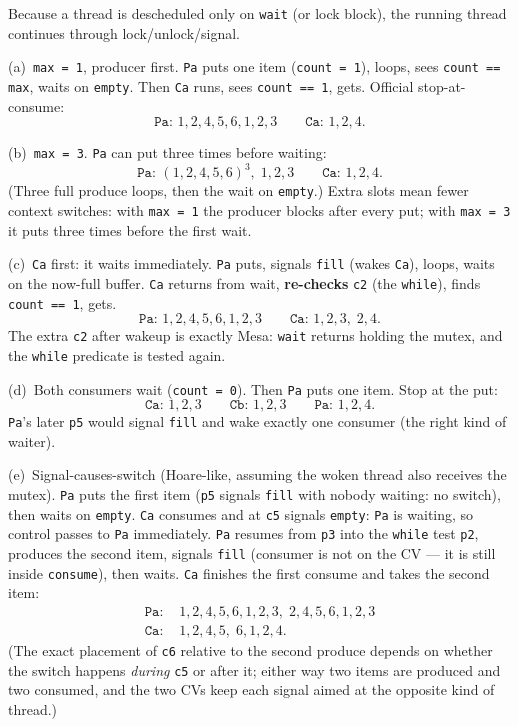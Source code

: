 \documentclass[11pt,a4paper]{article}
\newenvironment{Sol}{%
  \begin{tcolorbox}[sboxstyle, title={Solution}]%
}{%
  \end{tcolorbox}\vspace{0.35em}%
}
\begin{document}
\begin{Sol}
Because a thread is descheduled only on \texttt{wait} (or lock block),
the running thread continues through lock/unlock/signal.

(a)~\texttt{max = 1}, producer first. \texttt{Pa} puts one item
(\texttt{count = 1}), loops, sees \texttt{count == max}, waits on
\texttt{empty}. Then \texttt{Ca} runs, sees \texttt{count == 1}, gets.
Official stop-at-consume:
\[
\texttt{Pa: } 1,2,4,5,6,1,2,3
\qquad
\texttt{Ca: } 1,2,4.
\]

(b)~\texttt{max = 3}. \texttt{Pa} can put three times before waiting:
\[
\texttt{Pa: } (1,2,4,5,6)^3,\; 1,2,3
\qquad
\texttt{Ca: } 1,2,4.
\]
(Three full produce loops, then the wait on \texttt{empty}.) Extra
slots mean fewer context switches: with \texttt{max = 1} the producer
blocks after every put; with \texttt{max = 3} it puts three times
before the first wait.

(c)~\texttt{Ca} first: it waits immediately. \texttt{Pa} puts, signals
\texttt{fill} (wakes \texttt{Ca}), loops, waits on the now-full buffer.
\texttt{Ca} returns from wait, \textbf{re-checks} \texttt{c2} (the
\texttt{while}), finds \texttt{count == 1}, gets.
\[
\texttt{Pa: } 1,2,4,5,6,1,2,3
\qquad
\texttt{Ca: } 1,2,3,\;2,4.
\]
The extra \texttt{c2} after wakeup is exactly Mesa: \texttt{wait}
returns holding the mutex, and the \texttt{while} predicate is tested
again.

(d)~Both consumers wait (\texttt{count = 0}). Then \texttt{Pa} puts
one item. Stop at the put:
\[
\texttt{Ca: } 1,2,3
\qquad
\texttt{Cb: } 1,2,3
\qquad
\texttt{Pa: } 1,2,4.
\]
\texttt{Pa}'s later \texttt{p5} would signal \texttt{fill} and wake
exactly one consumer (the right kind of waiter).

(e)~Signal-causes-switch (Hoare-like, assuming the woken thread also receives the mutex). \texttt{Pa} puts the first item
(\texttt{p5} signals \texttt{fill} with nobody waiting: no switch),
then waits on \texttt{empty}. \texttt{Ca} consumes and at \texttt{c5}
signals \texttt{empty}: \texttt{Pa} is waiting, so control passes to
\texttt{Pa} immediately. \texttt{Pa} resumes from \texttt{p3} into the
\texttt{while} test \texttt{p2}, produces the second item, signals
\texttt{fill} (consumer is not on the CV --- it is still inside
\texttt{consume}), then waits. \texttt{Ca} finishes the first consume
and takes the second item:
\[
\begin{aligned}
\texttt{Pa: }& 1,2,4,5,6,1,2,3,\; 2,4,5,6,1,2,3\\
\texttt{Ca: }& 1,2,4,5,\; 6,1,2,4.
\end{aligned}
\]
(The exact placement of \texttt{c6} relative to the second produce
depends on whether the switch happens \emph{during} \texttt{c5} or
after it; either way two items are produced and two consumed, and
the two CVs keep each signal aimed at the opposite kind of thread.)
\end{Sol}
\end{document}
